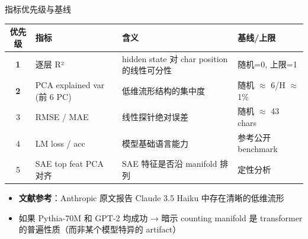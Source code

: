 \begin{frame}{指标优先级与基线}
\small
\begin{tabularx}{\linewidth}{cl>{\raggedright\arraybackslash}p{5cm}l}
\toprule
优先级 & 指标 & 含义 & 基线/上限 \\
\midrule
\textbf{1} & 逐层 R² & hidden state 对 char position 的线性可分性 & 随机=0, 上限=1 \\
\textbf{2} & PCA explained var (前 6 PC) & 低维流形结构的集中度 & 随机 $\approx$ 6/H $\approx$ 1\% \\
3 & RMSE / MAE & 线性探针绝对误差 & 随机 $\approx$ 43 chars \\
4 & LM loss / acc & 模型基础语言能力 & 参考公开 benchmark \\
5 & SAE top feat PCA 对齐 & SAE 特征是否沿 manifold 排列 & 定性分析 \\
\bottomrule
\end{tabularx}

\vspace{0.4em}
\begin{itemize}
  \item \textbf{文献参考}：Anthropic 原文报告 Claude 3.5 Haiku 中存在清晰的低维流形
  \item 如果 Pythia-70M 和 GPT-2 均成功 → 暗示 counting manifold 是 transformer 的普遍性质（而非某个模型特异的 artifact）
\end{itemize}
\end{frame}
